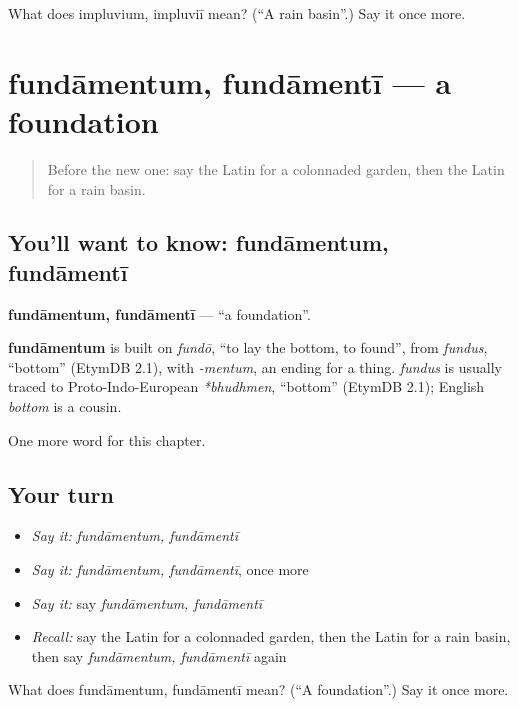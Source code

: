 \begin{tcolorbox}[breakable,colback=teal!4,colframe=teal!35!black,title={Before you move on}]
What does impluvium, impluviī mean? (\textquotedblleft{}A rain basin\textquotedblright{}.) Say it once more.
\end{tcolorbox}
\section[fundāmentum, fundāmentī]{fundāmentum, fundāmentī — a foundation}

\label{lesson:LA-C185-fundamentum}



\begin{quote}
Before the new one: say the Latin for a colonnaded garden, then the Latin for a rain basin.
\end{quote}

\subsection*{You'll want to know: fundāmentum, fundāmentī}
\textbf{fundāmentum, fundāmentī} — \textquotedblleft{}a foundation\textquotedblright{}.

\begin{cousinweb}
\textbf{fundāmentum} is built on \emph{fundō}, \textquotedblleft{}to lay the bottom, to found\textquotedblright{}, from \emph{fundus}, \textquotedblleft{}bottom\textquotedblright{} (EtymDB 2.1), with \emph{-mentum}, an ending for a thing. \emph{fundus} is usually traced to Proto-Indo-European \emph{*bhudhmen}, \textquotedblleft{}bottom\textquotedblright{} (EtymDB 2.1); English \emph{bottom} is a cousin.
\end{cousinweb}

\begin{grammarlens}[title={What you've built}]
One more word for this chapter.
\end{grammarlens}

\subsection*{Your turn}
\begin{itemize}
\raggedright
  \item \emph{Say it:} \emph{fundāmentum, fundāmentī}
  \item \emph{Say it:} \emph{fundāmentum, fundāmentī}, once more
  \item \emph{Say it:} say \emph{fundāmentum, fundāmentī}
  \item \emph{Recall:} say the Latin for a colonnaded garden, then the Latin for a rain basin, then say \emph{fundāmentum, fundāmentī} again
\end{itemize}

\begin{tcolorbox}[breakable,colback=teal!4,colframe=teal!35!black,title={Before you move on}]
What does fundāmentum, fundāmentī mean? (\textquotedblleft{}A foundation\textquotedblright{}.) Say it once more.
\end{tcolorbox}
